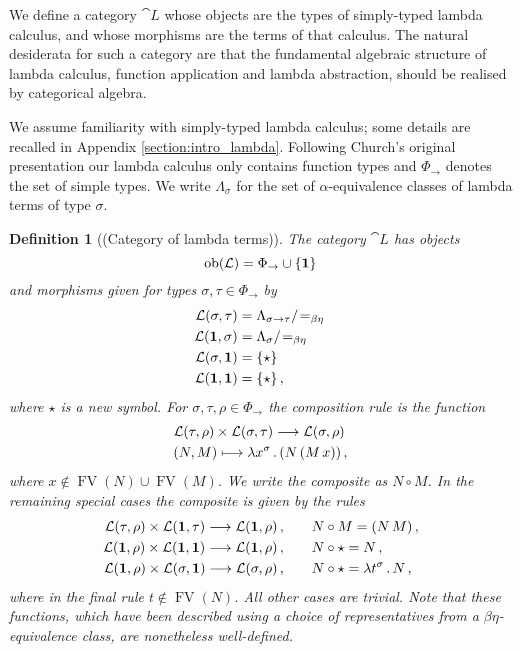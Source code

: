 \documentclass[english,letter paper,12pt,leqno]{article}
\theoremstyle{example}
\newtheorem{definition}[theorem]{Definition}
\numberwithin{equation}{section}
\def\ldot{\,.\,}
\def\FV{\operatorname{FV}}
\def\typearrow{\rightarrow}
\begin{document}
We define a category $\cat{L}$ whose objects are the types of simply-typed lambda calculus, and whose morphisms are the terms of that calculus. The natural desiderata for such a category are that the fundamental algebraic structure of lambda calculus, function application and lambda abstraction, should be realised by categorical algebra. 

We assume familiarity with simply-typed lambda calculus; some details are recalled in Appendix \ref{section:intro_lambda}. Following Church's original presentation our lambda calculus only contains function types and $\Phi_{\typearrow}$ denotes the set of simple types. We write $\Lambda_\sigma$ for the set of $\alpha$-equivalence classes of lambda terms of type $\sigma$. 

\begin{definition}[(Category of lambda terms)]\label{definition:lambda_cat} The category $\cat{L}$ has objects
\[
\operatorname{ob}(\cat{L}) = \Phi_{\typearrow} \cup \{ \bold{1} \}
\]
and morphisms given for types $\sigma, \tau \in \Phi_{\typearrow}$ by
\begin{align*}
\cat{L}(\sigma, \tau) &= \Lambda_{\sigma \typearrow \tau}/\!=_{\beta\eta}\,\\
\cat{L}(\bold{1}, \sigma) &= \Lambda_{\sigma}/\!=_{\beta\eta}\,\\
\cat{L}(\sigma, \bold{1}) &= \{ \star \}\,\\
\cat{L}(\bold{1},\bold{1}) &= \{ \star \}\,,
\end{align*}
where $\star$ is a new symbol. For $\sigma, \tau, \rho \in \Phi_{\typearrow}$ the composition rule is the function
\begin{gather*}
\cat{L}(\tau, \rho) \times \cat{L}(\sigma, \tau) \lto \cat{L}(\sigma, \rho)\,\\
(N,M) \longmapsto \lambda x^\sigma \ldot (N \, (M \, x))\,,
\end{gather*}
where $x \notin \FV(N) \cup \FV(M)$. We write the composite as $N \circ M$. In the remaining special cases the composite is given by the rules
\begin{align*}
\cat{L}(\tau, \rho) \times \cat{L}(\bold{1}, \tau) \lto \cat{L}(\bold{1}, \rho)\,, \qquad & N \circ M = (N \, M)\,,\\
\cat{L}(\bold{1}, \rho) \times \cat{L}(\bold{1}, \bold{1}) \lto \cat{L}(\bold{1}, \rho)\,, \qquad & N \circ \star = N\,,\\
\cat{L}(\bold{1}, \rho) \times \cat{L}(\sigma, \bold{1}) \lto \cat{L}(\sigma, \rho)\,, \qquad & N \circ \star = \lambda t^\sigma \ldot N\,,
\end{align*}
where in the final rule $t \notin \FV(N)$. All other cases are trivial. Note that these functions, which have been described using a choice of representatives from a $\beta\eta$-equivalence class, are nonetheless well-defined.
\end{definition}
\end{document}
